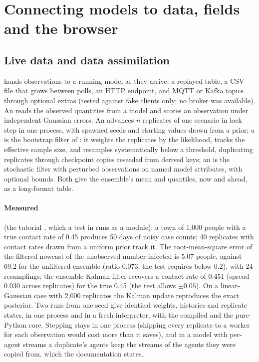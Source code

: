 \section{Connecting models to data, fields and the browser}
\label{sec:connect}

\subsection{Live data and data assimilation}
\label{sec:assimilation}

 hands observations to a running model as they arrive: a replayed table,
a CSV file that grows between polls, an HTTP endpoint, and MQTT or Kafka topics through
optional extras (tested against fake clients only; no broker was available). An
 reads the observed quantities from a model and scores an
observation under independent Gaussian errors. An  advances $n$ replicates of
one scenario in lock step in one process, with spawned seeds and starting values drawn from a
prior; a  is the bootstrap filter of \citet{gordon1993novel}: it weights
the replicates by the likelihood, tracks the effective sample size, and resamples
systematically \citep{douc2005comparison} below a threshold, duplicating replicates through
checkpoint copies reseeded from derived keys; an  is the
stochastic filter with perturbed observations \citep{evensen1994sequential, evensen2003ensemble}
on named model attributes, with optional bounds. Both give the ensemble's mean and quantiles,
now and ahead, as a long-format table.

\paragraph{Measured} (the tutorial , which a test in
 runs as a module): a town of 1,000 people with a true
contact rate of 0.45 produces 50 days of noisy case counts; 40 replicates with contact rates
drawn from a uniform prior track it. The root-mean-square error of the filtered nowcast of the
unobserved number infected is 5.07 people, against 69.2 for the unfiltered ensemble (ratio
0.073; the test requires below 0.2), with 24 resamplings; the ensemble Kalman filter
recovers a contact rate of 0.451 (spread 0.030 across replicates) for the true 0.45 (the test
allows $\pm 0.05$). On a linear-Gaussian case with 2,000 replicates the Kalman update
reproduces the exact posterior. Two runs from one seed give identical weights, histories and
replicate states, in one process and in a fresh interpreter, with the compiled and the
pure-Python core. Stepping stays in one process (shipping every replicate to a worker for each
observation would cost more than it saves), and in a model with per-agent streams a
duplicate's agents keep the streams of the agents they were copied from, which the
documentation states.

